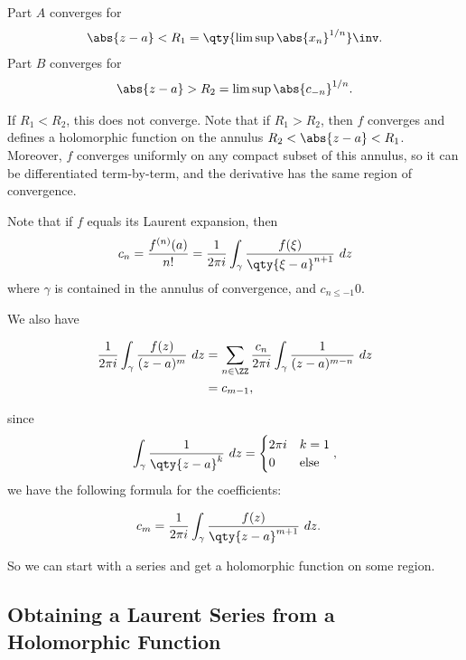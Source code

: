 Part \(A\) converges for
\begin{align*}\abs{z-a} < R_1 = \qty{\limsup \abs{x_n}^{1/n}} \inv.\end{align*}
Part \(B\) converges for
\begin{align*}\abs{z-a} > R_2 = \limsup \abs{c_{-n}}^{1/n}.\end{align*}

If \(R_1 < R_2\), this does not converge. Note that if \(R_1 > R_2\),
then \(f\) converges and defines a holomorphic function on the annulus
\(R_2 < \abs{z-a} < R_1\). Moreover, \(f\) converges uniformly on any
compact subset of this annulus, so it can be differentiated
term-by-term, and the derivative has the same region of convergence.

Note that if \(f\) equals its Laurent expansion, then
\begin{align*}c_n = \frac{f^{(n)}(a)}{n!} = \frac 1 {2\pi i} \int_\gamma \frac{f(\xi)}{\qty{\xi - a}^{n+1}} ~dz\end{align*}
where \(\gamma\) is contained in the annulus of convergence, and
\(c_{n\leq -1} 0\).

We also have

\begin{align*}
\frac 1 {2\pi i} \int_\gamma \frac{f(z)}{(z-a)^m} ~dz 
&= \sum_{n\in \ZZ} \frac{c_n}{2\pi i} \int_\gamma \frac{1}{(z-a)^{m-n}}~dz \\
&=c_{m-1}
,\end{align*}

since
\begin{align*}\int_\gamma \frac{1}{\qty{z-a}^k}~dz = \begin{cases} 2\pi i &k = 1 \\ 0 & \text{else}\end{cases},\end{align*}
we have the following formula for the coefficients:

\begin{align}
c_m &= \frac 1 {2\pi i} \int_\gamma \frac{f(z)}{\qty{z-a}^{m+1}} ~dz
.\end{align}

So we can start with a series and get a holomorphic function on some
region.

\hypertarget{obtaining-a-laurent-series-from-a-holomorphic-function}{%
\subsection{Obtaining a Laurent Series from a Holomorphic
Function}\label{obtaining-a-laurent-series-from-a-holomorphic-function}}


